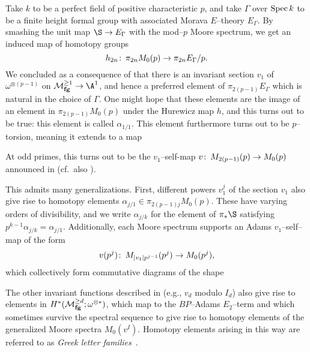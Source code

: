 \begin{example}
Take \(k\) to be a perfect field of positive characteristic \(p\), and take \(\Gamma\) over \(\operatorname{Spec} k\) to be a finite height formal group with associated Morava \(E\)--theory \(E_\Gamma\).  By smashing the unit map \(\S \to E_\Gamma\) with the mod--\(p\) Moore spectrum, we get an induced map of homotopy groups \[h_{2n}\colon\thinspace \pi_{2n} M_0(p) \to \pi_{2n} E_\Gamma/p.\]  We concluded as a consequence of  that there is an invariant section \(v_1\) of \(\omega^{\otimes(p-1)}\) on \(\moduli{fg}^{\ge 1} \to \A^1\), and hence a preferred element of \(\pi_{2(p-1)} E_\Gamma\) which is natural in the choice of \(\Gamma\).  One might hope that these elements are the image of an element in \(\pi_{2(p-1)} M_0(p)\) under the Hurewicz map \(h\), and this turns out to be true: this element is called \(\alpha_{1/1}\).  This element furthermore turns out to be \(p\)--torsion, meaning it extends to a map
\begin{center}
\end{center}
At odd primes, this turns out to be the \(v_1\)--self-map \(v\colon\thinspace M_{2(p-1)}(p) \to M_0(p)\) announced in  (cf.\ also \cite[Proposition 12.7]{AdamsJXIV}).

This admits many generalizations.  First, different powers \(v_1^j\) of the section \(v_1\) also give rise to homotopy elements \(\alpha_{j/1} \in \pi_{2(p-1)j} M_0(p)\).  These have varying orders of divisibility, and we write \(\alpha_{j/k}\) for the element of \(\pi_* \S\) satisfying \(p^{k-1} \alpha_{j/k} = \alpha_{j/1}\).  Additionally, each Moore spectrum supports an Adams \(v_1\)--self--map of the form \[v(p^j) \colon\thinspace M_{|v_1| p^{j-1}}(p^j) \to M_0(p^j),\] which collectively form commutative diagrams of the shape
\begin{center}
\end{center}
The other invariant functions described in  (e.g., \(v_d\) modulo \(I_d\)) also give rise to elements in \(H^*(\mathcal{M}_{\mathbf{fg}}^{\ge d}; \omega^{\otimes *})\), which map to the \(BP\)--Adams \(E_2\)--term and which sometimes survive the spectral sequence to give rise to homotopy elements of the generalized Moore spectra \(M_0(v^I)\).  Homotopy elements arising in this way are referred to as \textit{Greek letter families}~\cite[Section 3]{MRW}.
\end{example}

